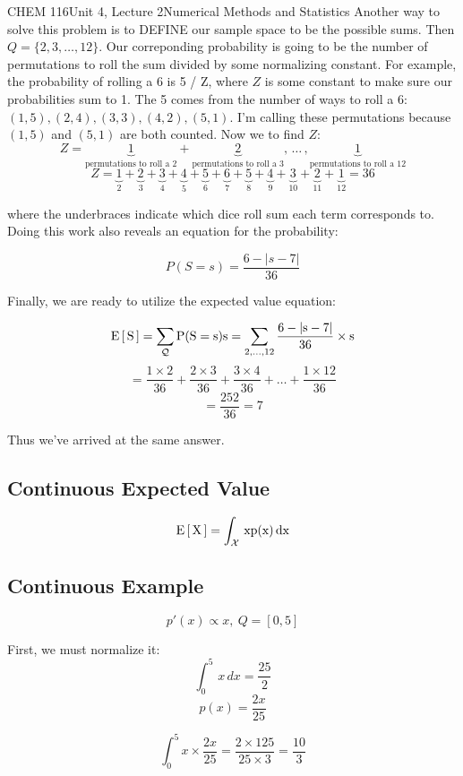 \documentclass{article}
\begin{document}
\begin{tdoc}{CHEM 116}{Unit 4, Lecture 2}{Numerical Methods and Statistics}
Another way to solve this problem is to DEFINE our sample space to be
the possible sums. Then $Q = \{2, 3, \ldots, 12\}$. Our correponding
probability is going to be the number of permutations to roll the sum
divided by some normalizing constant. For example, the probability of
rolling a 6 is 5 / Z, where $Z$ is some constant to make sure our
probabilities sum to 1. The 5 comes from the number of ways to roll a
6: $(1, 5), (2, 4), (3, 3), (4, 2), (5, 1)$. I'm calling these permutations because $(1,5)$ and $(5,1)$ are both counted. Now we to find $Z$:
\[
Z = \underbrace{1}_{\textrm{permutations to roll a 2}} + \underbrace{2}_{\textrm{permutations to roll a 3}},\, \ldots\,, \underbrace{1}_{\textrm{permutations to roll a 12}}
\]
\[
Z = \underbrace{1}_2 + \underbrace{2}_3 + \underbrace{3}_4 + \underbrace{4}_5 + \underbrace{5}_6 + \underbrace{6}_7 + \underbrace{5}_8 + \underbrace{4}_9 + \underbrace{3}_{10} + \underbrace{2}_{11} + \underbrace{1}_{12} = 36
\]

where the underbraces indicate which dice roll sum each term corresponds
to. Doing this work also reveals an equation for the probability:

\[
P(S = s) = \frac{6 - |s - 7|}{36}
\]

Finally, we are ready to utilize the expected value equation:

\[
\rm{E}\left[\,S\,\right] = \sum_\mathcal{Q} P(S=s)s = \sum_{2,\ldots,12} \frac{6 - |s - 7|}{36}\times s
\]
\[
= \frac{1 \times 2}{36} + \frac{2 \times 3}{36} + \frac{3 \times 4}{36} + \ldots + \frac{1 \times 12}{36}
\]
\[
= \frac{252}{36} = 7
\]

Thus we've arrived at the same answer.

\subsection{Continuous Expected Value}

\begin{equation}
\rm{E}\left[\,X\,\right] = \int_\mathcal{X}\,xp(x)\,dx
\end{equation}


\subsection{Continuous Example}
\[
p'(x) \propto x,\:  Q = [0,5]
\]

First, we must normalize it:
\[
\int_0^5 \,x\,dx = \frac{25}{2}
\]
\[
p(x) = \frac{2x}{25}
\]

\[
\int_0^5 x\times\frac{2x}{25} = \frac{2\times 125}{25\times 3} = \frac{10}{3}
\]


\end{tdoc}
\end{document}
